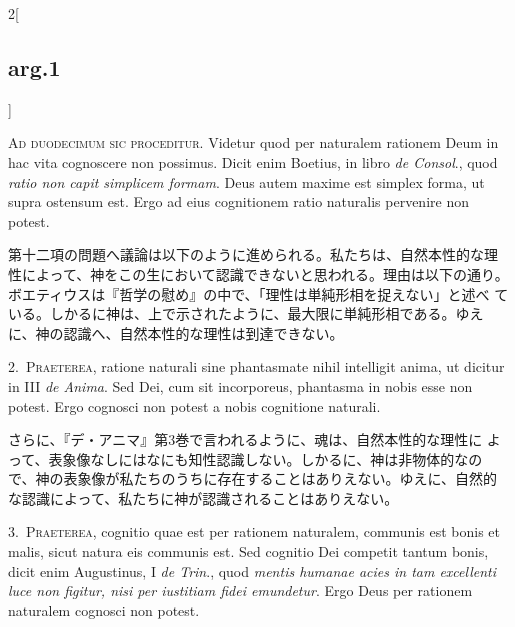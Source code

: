 \documentclass[paper=a4paper,fontsize=10pt,jafontsize=9pt,titlepage]{jlreq}
\begin{document}
\begin{paracol}{2}[\subsection{arg.1}]

{\scshape  Ad duodecimum sic proceditur}. Videtur quod per naturalem rationem
Deum in hac vita cognoscere non possimus. Dicit enim Boetius, in libro
{\itshape de Consol}., quod {\itshape ratio non capit simplicem formam}. Deus
autem maxime est simplex forma, ut supra ostensum est. Ergo ad eius
cognitionem ratio naturalis pervenire non potest.

\switchcolumn

第十二項の問題へ議論は以下のように進められる。私たちは、自然本性的な理
性によって、神をこの生において認識できないと思われる。理由は以下の通り。
ボエティウスは『哲学の慰め』の中で、「理性は単純形相を捉えない」と述べ
ている。しかるに神は、上で示されたように、最大限に単純形相である。ゆえ
に、神の認識へ、自然本性的な理性は到達できない。


2.~{\scshape  Praeterea}, ratione naturali sine phantasmate nihil
intelligit anima, ut dicitur in III {\itshape de Anima}. Sed Dei, cum sit
incorporeus, phantasma in nobis esse non potest. Ergo cognosci non
potest a nobis cognitione naturali.

\switchcolumn

さらに、『デ・アニマ』第3巻で言われるように、魂は、自然本性的な理性に
よって、表象像なしにはなにも知性認識しない。しかるに、神は非物体的なの
で、神の表象像が私たちのうちに存在することはありえない。ゆえに、自然的
な認識によって、私たちに神が認識されることはありえない。


3.~{\scshape Praeterea}, cognitio quae est per rationem naturalem, communis
est bonis et malis, sicut natura eis communis est. Sed cognitio Dei
competit tantum bonis, dicit enim Augustinus, I {\itshape de Trin}., quod
{\itshape mentis humanae acies in tam excellenti luce non figitur, nisi per
iustitiam fidei emundetur}. Ergo Deus per rationem naturalem cognosci
non potest.


\end{paracol}
\end{document}
